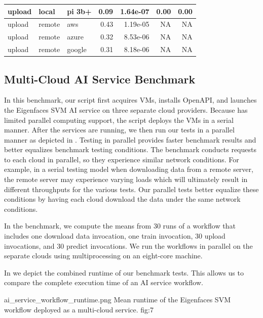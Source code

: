\begin{table}[htb]
{\begin{tabular}{lllrrrr}
            upload &   local &    pi 3b+ &    0.09 & 1.64e-07 &                0.00 &             0.00 \\
\midrule
            upload &  remote &       aws &    0.43 & 1.19e-05 &                 NA &              NA \\
            upload &  remote &     azure &    0.32 & 8.53e-06 &                 NA &              NA \\
            upload &  remote &    google &    0.31 & 8.18e-06 &                 NA &              NA \\
\bottomrule
\end{tabular}
}
\end{table}

\subsection{Multi-Cloud AI Service Benchmark}
\label{sec-multi-benchmark}

In this benchmark, our script first acquires VMs, installs \Cloudmesh
OpenAPI, and launches the Eigenfaces SVM AI service on three separate
cloud providers. Because \Cloudmesh has limited parallel computing
support, the script deploys the VMs in a serial manner. After the
services are running, we then run our tests in a parallel manner as
depicted in . Testing in parallel provides faster benchmark
results and better equalizes benchmark testing conditions. The
benchmark conducts requests to each cloud in parallel, so they experience similar network conditions. For example, in a serial testing
model when downloading data from a remote server, the remote server may experience varying loads which will ultimately result in different throughputs for the various tests. Our parallel tests better equalize these conditions by having each cloud download the data under the same network conditions.

In the benchmark, we compute the means from 30 runs of a workflow that includes one download data invocation, one train invocation,
30 upload invocations, and 30 predict invocations. We run the workflows
in parallel on the separate clouds using multiprocessing on an eight-core
machine.

In  we depict the combined runtime of our benchmark tests. This allows us to compare the complete execution time of an AI service workflow.

\OneFIGURE
    {ai_service_workflow_runtime.png}
    {Mean runtime of the Eigenfaces SVM workflow deployed
     as a multi-cloud service.}
    {fig:7}

